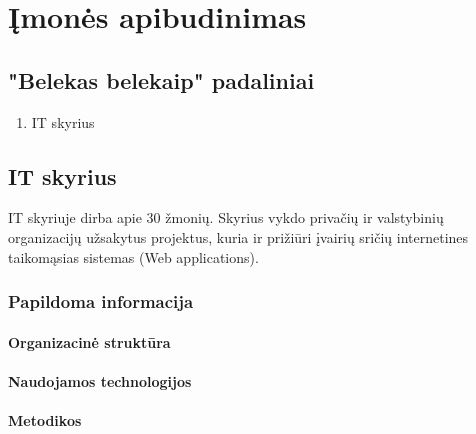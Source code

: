 \section{Įmonės apibudinimas}

\subsection{"Belekas belekaip" padaliniai}

\begin{enumerate}
    \item  IT skyrius
\end{enumerate}

\subsection{IT skyrius}

IT skyriuje dirba apie 30 žmonių. Skyrius vykdo privačių ir valstybinių organizacijų užsakytus projektus, kuria ir prižiūri įvairių sričių internetines taikomąsias sistemas (Web applications).

\subsubsection{Papildoma informacija}

\paragraph{Organizacinė struktūra}
\paragraph{Naudojamos technologijos}
\paragraph{Metodikos}
